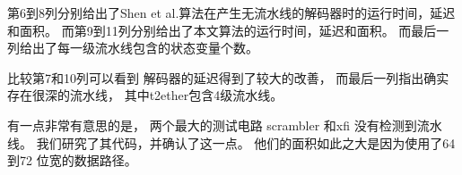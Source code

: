 第6到8列分别给出了Shen et al.算法在产生无流水线的解码器时的运行时间，延迟和面积。
而第9到11列分别给出了本文算法的运行时间，延迟和面积。
而最后一列给出了每一级流水线包含的状态变量个数。

比较第7和10列可以看到
解码器的延迟得到了较大的改善，
而最后一列指出确实存在很深的流水线，
其中t2ether包含4级流水线。

有一点非常有意思的是，
两个最大的测试电路 scrambler 和xfi 没有检测到流水线。
我们研究了其代码，并确认了这一点。
他们的面积如此之大是因为使用了64 到72 位宽的数据路径。

%
%
%


%
%
%

